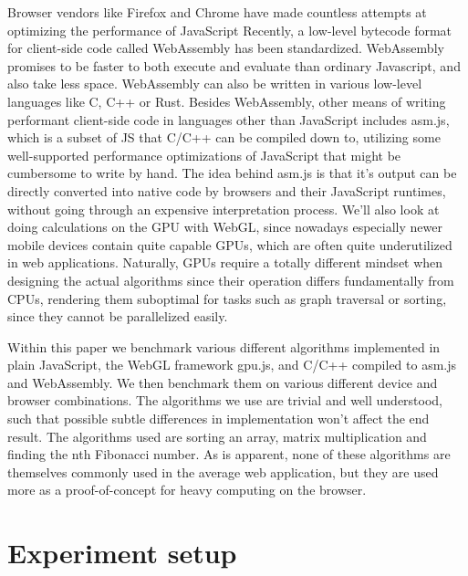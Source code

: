 \documentclass[conference]{IEEEtran}
\begin{document}
Browser vendors like Firefox and Chrome have made countless attempts at
optimizing the performance of JavaScript Recently, a low-level bytecode format
for client-side code called WebAssembly has been standardized. WebAssembly
promises to be faster to both execute and evaluate than ordinary Javascript,
and also take less space. WebAssembly can also be written in various low-level
languages like C, C++ or Rust. Besides WebAssembly, other means of writing
performant client-side code in languages other than JavaScript includes asm.js,
which is a subset of JS that C/C++ can be compiled down to, utilizing some
well-supported performance optimizations of JavaScript that might be cumbersome
to write by hand. The idea behind asm.js is that it’s output can be directly
converted into native code by browsers and their JavaScript runtimes, without
going through an expensive interpretation process. We'll also look at doing
calculations on the GPU with WebGL, since nowadays especially newer mobile
devices contain quite capable GPUs, which are often quite underutilized in web
applications. Naturally, GPUs require a totally different mindset when
designing the actual algorithms since their operation differs fundamentally
from CPUs, rendering them suboptimal for tasks such as graph traversal or
sorting, since they cannot be parallelized easily.

Within this paper we benchmark various different algorithms implemented in
plain JavaScript, the WebGL framework gpu.js, and C/C++ compiled to asm.js and
WebAssembly.  We then benchmark them on various different device and browser
combinations. The algorithms we use are  trivial and well understood, such that
possible subtle differences in implementation won't affect the end result. The
algorithms used are sorting an array, matrix multiplication and finding the nth
Fibonacci number. As is apparent, none of these algorithms are themselves
commonly used in the average web application, but they are used more as a
proof-of-concept for heavy computing on the browser.

\section{Experiment setup}
\end{document}
